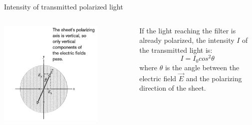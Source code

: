 \begin{frame}{Intensity of transmitted polarized light}
\begin{columns}
  \begin{column}{0.40\textwidth}
    \begin{center}
       \includegraphics[width=0.75\textwidth]{./images/schematics/polarized_light_sent_through_filter.png}\\
    \end{center}
  \end{column}
  \begin{column}{0.60\textwidth}
      If the light reaching the filter is already polarized,
      the intensity $I$ of the transmitted light is:
      \begin{equation*}
        I = I_0 cos^2\theta
      \end{equation*}
      where $\theta$ is the angle between the electric field $\vec{E}$
      and the polarizing direction of the sheet.
  \end{column}
\end{columns}


\end{frame}



%
%

